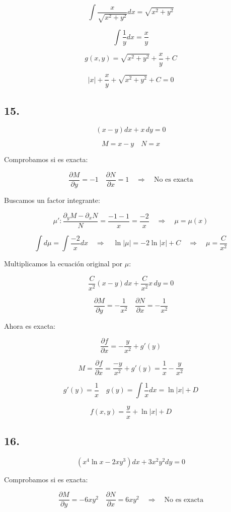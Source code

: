 \documentclass[a4paper,12pt]{article}
\begin{document}
\[
\int \frac{x}{\sqrt{x^2 + y^2}} dx = \sqrt{x^2 + y^2}
\]

\[
\int \frac{1}{y} dx = \frac{x}{y}
\]

\[
g(x,y) = \sqrt{x^2 + y^2} + \frac{x}{y} + C
\]

\[
|x| + \frac{x}{y} + \sqrt{x^2 + y^2} + C = 0
\]
\subsection*{15.}
\[
(x - y)dx + x\, dy = 0
\]

\[
M = x - y \quad N = x
\]

Comprobamos si es exacta:

\[
\frac{\partial M}{\partial y} = -1 \quad \frac{\partial N}{\partial x} = 1 \quad \Rightarrow \quad \text{No es exacta}
\]

Buscamos un factor integrante:

\[
\mu': \frac{\partial_y M - \partial_x N}{N} = \frac{-1 - 1}{x} = \frac{-2}{x} \quad \Rightarrow \quad \mu = \mu(x)
\]

\[
\int d\mu = \int \frac{-2}{x} dx \quad \Rightarrow \quad \ln|\mu| = -2 \ln|x| + C \quad \Rightarrow \quad \mu = \frac{C}{x^2}
\]

Multiplicamos la ecuación original por $\mu$:

\[
\frac{C}{x^2}(x - y) dx + \frac{C}{x^2} x\, dy = 0
\]

\[
\frac{\partial M}{\partial y} = -\frac{1}{x^2} \quad \frac{\partial N}{\partial x} = -\frac{1}{x^2}
\]

Ahora es exacta:

\[
\frac{\partial f}{\partial x} = -\frac{y}{x^2} + g'(y)
\]

\[
M = \frac{\partial f}{\partial x} = \frac{-y}{x^2} + g'(y) = \frac{1}{x} - \frac{y}{x^2}
\]

\[
g'(y) = \frac{1}{x} \quad g(y) = \int \frac{1}{x} dx = \ln|x| + D
\]

\[
f(x,y) = \frac{y}{x} + \ln|x| + D
\]


\subsection*{16.}
\[
(x^4 \ln x - 2x y^3) dx + 3x^2 y^2 dy = 0
\]

Comprobamos si es exacta:

\[
\frac{\partial M}{\partial y} = -6xy^2 \quad \frac{\partial N}{\partial x} = 6xy^2 \quad \Rightarrow \quad \text{No es exacta}
\]
\end{document}
